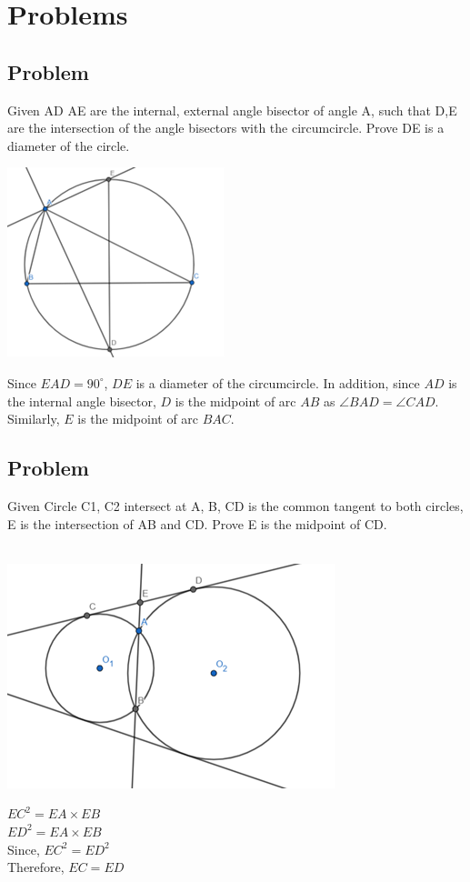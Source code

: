 \documentclass{article}
\begin{document}
\section{Problems}

\subsection{Problem}
Given AD AE are the internal, external angle bisector of angle A,
 such that D,E are the intersection of the angle bisectors with the circumcircle. 
 Prove DE is a diameter of the circle.

\includegraphics{Picture16.png}

Since $EAD =90^\circ$, $DE$ is a diameter of the circumcircle.
In addition, since $AD$ is the internal angle bisector,
$D$ is the midpoint of arc $AB$ as $\angle BAD = \angle CAD$.
Similarly, $E$ is the midpoint of arc $BAC$.

\subsection{Problem}
Given Circle C1, C2 intersect at A, B, CD is the common tangent to both circles, 
E is the intersection of AB and CD. Prove E is the midpoint of CD.
\\\\
\begin{minipage}{0.2\linewidth}
\includegraphics{Picture17.png}
\end{minipage}
\hfill
\begin{minipage}{0.35\linewidth}
$EC^2=EA\times EB$\\
$ED^2=EA\times EB$\\
Since, $EC^2=ED^2$\\
Therefore, $EC=ED$
\end{minipage}
\pagebreak
\end{document}
